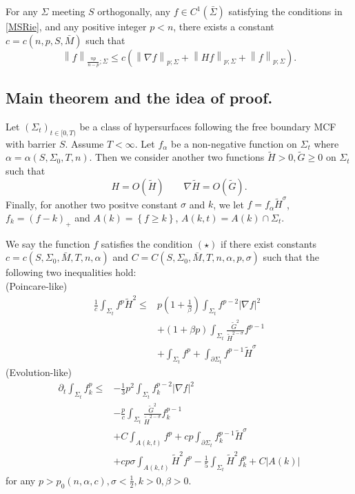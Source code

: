 \begin{theorem} \label{MSfree}
    For any $\Sigma $ meeting $S$ orthogonally, any $f \in C^{1}(\bar{\Sigma })$ satisfying the conditions in \autoref{MSRie}, and any positive integer $p<n$, there exists a constant $c=c(n,p,S,\bar{M})$ such that 
    \[\left\| f \right\| _{\frac{np}{n-p};\Sigma } \leq c(\left\| \nabla f \right\| _{p;\Sigma }+\left\| Hf \right\| _{p;\Sigma }+\left\|  f \right\| _{p;\Sigma }).\] 
\end{theorem}

\subsection{Main theorem and the idea of proof.}

Let $\left( \Sigma _t \right) _{t \in [0,T)}$ be a class of hypersurfaces following the free boundary MCF with barrier $S$. Assume $T<\infty $. Let $f_{\alpha }$ be a non-negative function on $\Sigma _t$ where $\alpha = \alpha (S, \Sigma _0,T,n)$. Then we consider another two functions $\tilde{H}>0,\tilde{G}\geq 0$ on $\Sigma _t$ such that 
\[
    H=O(\tilde{H}) \qquad \nabla \tilde{H}=O(\tilde{G}).    
\]
Finally, for another two positve constant $\sigma$ and $k$, we let $f=f_{\alpha }\tilde{H}^{\sigma }$, $f_k=\left( f-k \right) _{+}$ and $A(k)=\left\{ f \geq k \right\} $, $A(k,t)=A(k)\cap \Sigma _t$.

We say the function $f$ satisfies the condition $(\star)$ if there exist constants $c=c(S, \Sigma_0,\bar{M},T,n,\alpha )$ and $C=C(S,\Sigma _0,\bar{M},T,n,\alpha ,p,\sigma )$ such that the following two inequalities hold:\\
(Poincare-like)
\begin{equation} \label{PLE}
\begin{split}
    \frac{1}{c}\int_{\Sigma_t} f^p \tilde{H}^2 
\leq &  p \left( 1+\frac{1}{\beta } \right) \int_{\Sigma_t} f^{p-2}\left| \nabla f \right| ^2  \\
&+\left( 1+\beta p \right) \int_{\Sigma_t} \frac{\tilde{G}^2}{\tilde{H}^{2-\sigma }}f^{p-1}\\
&+\int_{\Sigma_t} f^p+\int_{\partial \Sigma_t} f^{p-1}\tilde{H}^{\sigma }
\end{split}
\end{equation}
(Evolution-like)
\begin{equation} \label{ELE}
    \begin{split}
        \partial_t \int_{\Sigma_t} f_k^p
    \leq &  -\frac{1}{3}p^2 \int_{\Sigma_t} f_{k}^{p-2}\left| \nabla f \right| ^2  \\
    &-\frac{p}{c} \int_{\Sigma_t} \frac{\tilde{G}^2}{\tilde{H}^{2-\sigma }}f_{k}^{p-1}\\
    &+C \int_{A(k,t)} f^p+cp\int_{\partial \Sigma_t} f_{k}^{p-1}\tilde{H}^{\sigma }\\
    &+cp \sigma \int_{A(k,t)}^{}\tilde{H}^2f^p-\frac{1}{5}\int_{\Sigma_t} \tilde{H}^2f_{k}^{p}+C \left| A(k) \right| 
    \end{split}
    \end{equation}
for any $p>p_0(n,\alpha ,c), \sigma <\frac{1}{2}, k>0, \beta >0$. 

